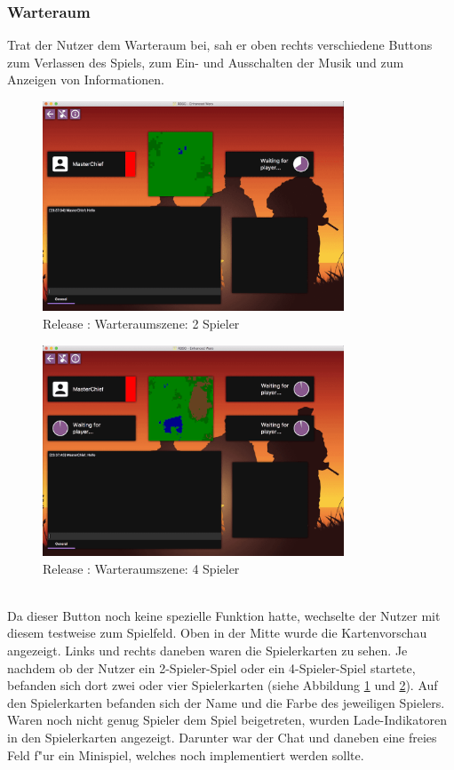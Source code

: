 \documentclass[12pt, titlepage]{scrartcl}
\newcommand{\RN}[1]{%
	\textup{\uppercase\expandafter{\romannumeral#1}}%
}
\begin{document}
	        \subsubsection{Warteraum} \label{WAITING_ROOM}
                Trat der Nutzer dem Warteraum bei, sah er oben rechts verschiedene Buttons zum Verlassen des Spiels, zum Ein- und Ausschalten der Musik und zum Anzeigen von Informationen. \\
                \begin{figure}[H] 
    				\centering
    				\includegraphics[width=0.8\textwidth]{images/old_state/waiting_room/2Player.png}
    				\caption{Release \RN{2}: Warteraumszene: 2 Spieler}
    				\label{Waiting_Room_2}
			    \end{figure}
			    \begin{figure}[H] 
    				\centering
    				\includegraphics[width=0.8\textwidth]{images/old_state/waiting_room/4Player.png}
    				\caption{Release \RN{2}: Warteraumszene: 4 Spieler}
    				\label{Waiting_Room_4}
			    \end{figure}
			    \ \\  Da dieser Button noch keine spezielle Funktion hatte, wechselte der Nutzer mit diesem testweise zum Spielfeld. Oben in der Mitte wurde die Kartenvorschau angezeigt. Links und rechts daneben waren die Spielerkarten zu sehen. Je nachdem ob der Nutzer ein 2-Spieler-Spiel oder ein 4-Spieler-Spiel startete, befanden sich dort zwei oder vier Spielerkarten (siehe Abbildung \ref{Waiting_Room_2} und \ref{Waiting_Room_4}). Auf den Spielerkarten befanden sich der Name und die Farbe des jeweiligen Spielers. Waren noch nicht genug Spieler dem Spiel beigetreten, wurden Lade-Indikatoren in den Spielerkarten angezeigt. Darunter war der Chat und daneben eine freies Feld f"ur ein Minispiel, welches noch implementiert werden sollte.
\end{document}
